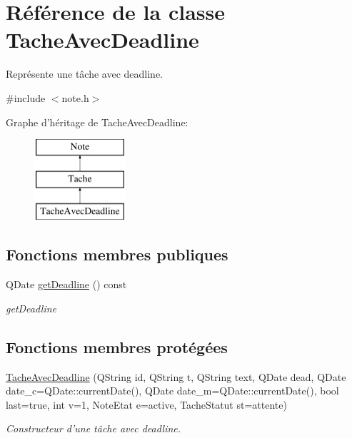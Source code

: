 \hypertarget{class_tache_avec_deadline}{\section{Référence de la classe Tache\-Avec\-Deadline}
\label{class_tache_avec_deadline}
}


Représente une tâche avec deadline.  




{\ttfamily \#include $<$note.\-h$>$}

Graphe d'héritage de Tache\-Avec\-Deadline\-:\begin{figure}[H]
\begin{center}
\leavevmode
\includegraphics[height=3.000000cm]{class_tache_avec_deadline}
\end{center}
\end{figure}
\subsection*{Fonctions membres publiques}
\begin{DoxyCompactItemize}
\item 
Q\-Date \hyperlink{class_tache_avec_deadline_a108926cb0f3aeb527f952faa34a5a81a}{get\-Deadline} () const 
\begin{DoxyCompactList}\small\item\em get\-Deadline \end{DoxyCompactList}\end{DoxyCompactItemize}
\subsection*{Fonctions membres protégées}
\begin{DoxyCompactItemize}
\item 
\hyperlink{class_tache_avec_deadline_aa8b2ac4efce7571174313a6396e4d4bd}{Tache\-Avec\-Deadline} (Q\-String id, Q\-String t, Q\-String text, Q\-Date dead, Q\-Date date\-\_\-c=Q\-Date\-::current\-Date(), Q\-Date date\-\_\-m=Q\-Date\-::current\-Date(), bool last=true, int v=1, Note\-Etat e=active, Tache\-Statut st=attente)
\begin{DoxyCompactList}\small\item\em Constructeur d'une tâche avec deadline. \end{DoxyCompactList}\end{DoxyCompactItemize}
